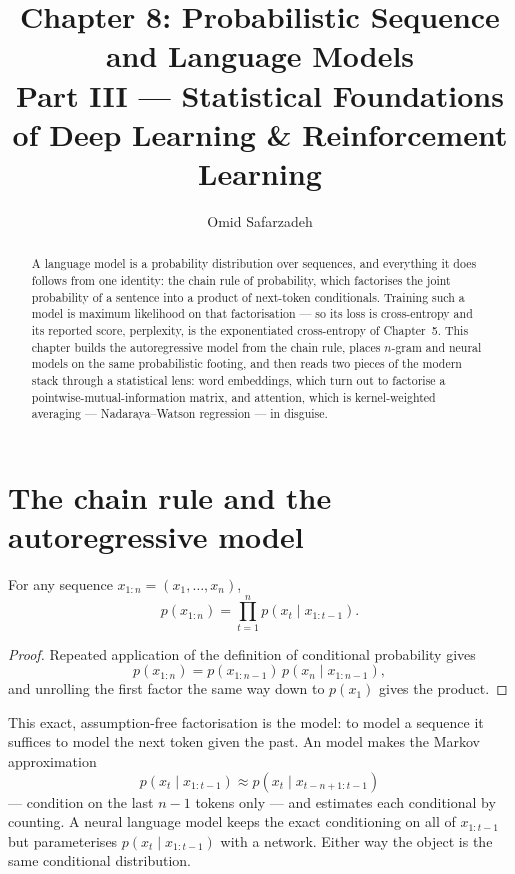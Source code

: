 \documentclass[11pt]{article}
\title{Chapter 8: Probabilistic Sequence and Language Models \\ \large Part III --- Statistical Foundations of Deep Learning \& Reinforcement Learning}
\author{Omid Safarzadeh}
\date{}
\begin{document}
\maketitle

\begin{abstract}
\noindent
A language model is a probability distribution over sequences, and everything it
does follows from one identity: the chain rule of probability, which factorises
the joint probability of a sentence into a product of next-token conditionals.
Training such a model is maximum likelihood on that factorisation --- so its loss
is cross-entropy and its reported score, perplexity, is the exponentiated
cross-entropy of Chapter~5. This chapter builds the autoregressive model from the
chain rule, places $n$-gram and neural models on the same probabilistic footing,
and then reads two pieces of the modern stack through a statistical lens: word
embeddings, which turn out to factorise a pointwise-mutual-information matrix, and
attention, which is kernel-weighted averaging --- Nadaraya--Watson regression ---
in disguise.
\end{abstract}

\tableofcontents

\section{The chain rule and the autoregressive model}

\begin{theorem}
For any sequence $x_{1:n}=(x_1,\dots,x_n)$,
\[
  p(x_{1:n}) = \prod_{t=1}^n p(x_t\mid x_{1:t-1}).
\]
\end{theorem}
\begin{proof}
Repeated application of the definition of conditional probability gives
\[
  p(x_{1:n}) = p(x_{1:n-1})\,p(x_n\mid x_{1:n-1}),
\]
and unrolling the first factor the same way down to $p(x_1)$ gives the product.
\end{proof}

This exact, assumption-free factorisation is the  model:
to model a sequence it suffices to model the next token given the past. An
 model makes the Markov approximation
\[
  p(x_t\mid x_{1:t-1}) \approx p(x_t\mid x_{t-n+1:t-1})
\]
--- condition on the last $n-1$ tokens only --- and estimates each conditional by
counting. A neural language model keeps the
exact conditioning on all of $x_{1:t-1}$ but parameterises $p(x_t\mid x_{1:t-1})$
with a network. Either way the object is the same conditional distribution.
\end{document}
